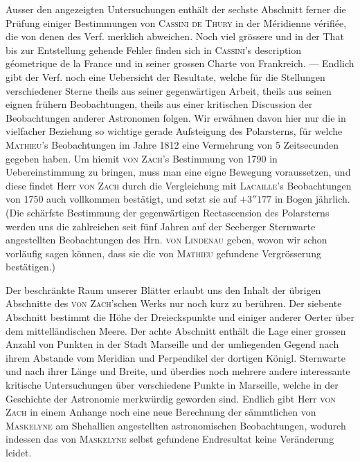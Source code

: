 Ausser den angezeigten Untersuchungen enthält der sechste Abschnitt ferner die Prüfung einiger Bestimmungen von \textsc{Cassini de Thury} in der Méridienne vérifiée, die von denen des Verf. merklich abweichen. Noch viel grössere und in der That bis zur Entstellung gehende Fehler finden sich in \textsc{Cassini}'s description géometrique de la France und in seiner grossen Charte von Frankreich. --- Endlich gibt der Verf. noch eine Uebersicht der Resultate, welche für die Stellungen verschiedener Sterne theils aus seiner gegenwärtigen Arbeit, theils aus seinen eignen frühern Beobachtungen, theils aus einer kritischen Discussion der Beobachtungen anderer Astronomen folgen. Wir erwähnen davon hier nur die in vielfacher Beziehung so wichtige gerade Aufsteigung des Polarsterns, für welche \textsc{Mathieu}'s Beobachtungen im Jahre 1812 eine Vermehrung von 5 Zeitsecunden gegeben haben. Um hiemit \textsc{von Zach}'s Bestimmung von 1790 in Uebereinstimmung zu bringen, muss man eine eigne Bewegung voraussetzen, und diese findet Herr \textsc{von Zach} durch die Vergleichung mit \textsc{Lacaille}'s Beobachtungen von 1750 auch vollkommen bestätigt, und setzt sie auf $+3''177$ in Bogen jährlich. (Die schärfste Bestimmung der gegenwärtigen Rectascension des Polarsterns werden uns die zahlreichen seit fünf Jahren auf der Seeberger Sternwarte angestellten Beobachtungen des Hrn. \textsc{von Lindenau} geben, wovon wir schon vorläufig sagen können, dass sie die von \textsc{Mathieu} gefundene Vergrösserung bestätigen.)

Der beschränkte Raum unserer Blätter erlaubt uns den Inhalt der übrigen Abschnitte des \textsc{von Zach}'schen Werks nur noch kurz zu berühren. Der siebente Abschnitt bestimmt die Höhe der Dreieckspunkte und einiger anderer Oerter über dem mittelländischen Meere. Der achte Abschnitt enthält die Lage einer grossen Anzahl von Punkten in der Stadt Marseille und der umliegenden Gegend nach ihrem Abstande vom Meridian und Perpendikel der dortigen Königl. Sternwarte und nach ihrer Länge und Breite, und überdies noch mehrere andere interessante kritische Untersuchungen über
verschiedene Punkte in Marseille, welche in der Geschichte der Astronomie merkwürdig geworden
sind. Endlich gibt Herr \textsc{von Zach} in einem Anhange noch eine neue Berechnung der
sämmtlichen von \textsc{Maskelyne} am Shehallien angestellten astronomischen Beobachtungen,
wodurch indessen das von \textsc{Maskelyne} selbst gefundene Endresultat keine Veränderung
leidet.
